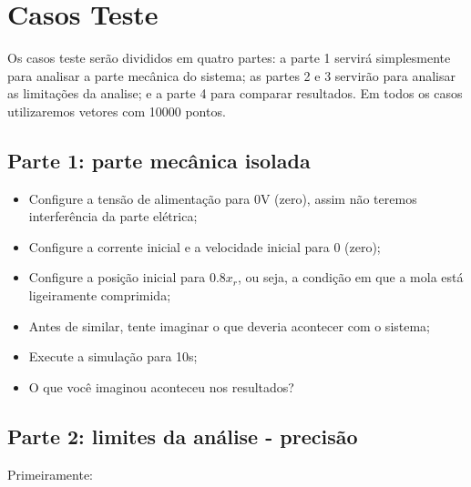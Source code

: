 \documentclass[a4paper]{article}
\theoremstyle{definition}
\theoremstyle{plain}
\begin{document}
\section{Casos Teste}

Os casos teste serão divididos em quatro partes: a parte 1  servirá simplesmente para analisar a parte mecânica do sistema; as partes 2 e 3 servirão para analisar as limitações da analise; e a parte 4 para comparar resultados. Em todos os casos utilizaremos vetores com 10000 pontos. 




\subsection{Parte 1: parte mecânica isolada}


\begin{itemize}
\item Configure a tensão de alimentação para 0V (zero), assim não teremos interferência da parte elétrica;

\item Configure a corrente inicial e a velocidade inicial para 0 (zero);

\item Configure a posição inicial para $0.8x_r$, ou seja, a condição em que a mola está ligeiramente comprimida;

\item Antes de similar, tente imaginar o que deveria acontecer com o sistema;

\item Execute a simulação para 10s;

\item O que você imaginou aconteceu nos resultados?

\end{itemize}




\subsection{Parte 2: limites da análise - precisão}

Primeiramente:
\end{document}
